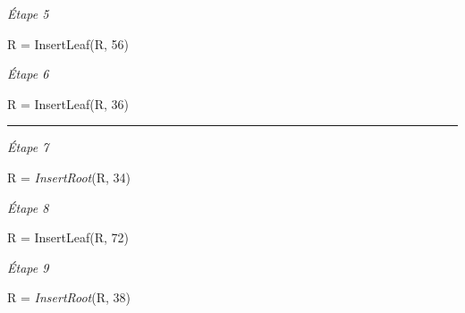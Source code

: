 \documentclass[11pt,a4paper]{article}
\begin{document}
\begin{center}
\begin{table}[ht!]
\begin{minipage}{0.33\textwidth}
\textit{\'Etape 5}

R = InsertLeaf(R, 56)

\vspace*{6cm}

  \end{minipage}
  \hfillx
  \begin{minipage}{0.33\textwidth}
    \centering

\textit{\'Etape 6}

R = InsertLeaf(R, 36)

\vspace*{6cm}

  \end{minipage}
\end{table}

\vspace*{-0.5cm}
\rule{1.0\linewidth}{0.75pt}



\begin{table}[ht!]
  \centering
  \begin{minipage}{0.50\textwidth}
    \centering

\textit{\'Etape 7}

R = \textit{InsertRoot}(R, 34)

\vspace*{7cm}

  \end{minipage}
  \hfillx
  \begin{minipage}{0.50\textwidth}
    \centering

\textit{\'Etape 8}

R = InsertLeaf(R, 72)

\vspace*{7cm}

  \end{minipage}
\end{table}

\clearpage


\begin{table}[ht!]
  \centering
  \begin{minipage}{0.50\textwidth}
    \centering

\textit{\'Etape 9}

R = \textit{InsertRoot}(R, 38)

\vspace*{7cm}

  \end{minipage}
  \hfillx
  \begin{minipage}{0.50\textwidth}
    \centering


\end{minipage}
\end{table}
\end{center}
\end{document}

